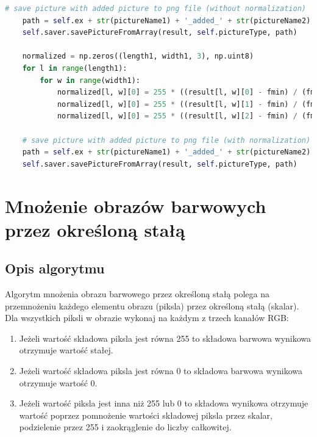 \documentclass[a4paper,12pt, titlepage]{report}
\begin{document}
\begin{lstlisting}[language=Python]
    # save picture with added picture to png file (without normalization)
    path = self.ex + str(pictureName1) + '_added_' + str(pictureName2) + '.png'
    self.saver.savePictureFromArray(result, self.pictureType, path)

    normalized = np.zeros((length1, width1, 3), np.uint8)
    for l in range(length1):
        for w in range(width1):
            normalized[l, w][0] = 255 * ((result[l, w][0] - fmin) / (fmax - fmin))
            normalized[l, w][0] = 255 * ((result[l, w][1] - fmin) / (fmax - fmin))
            normalized[l, w][0] = 255 * ((result[l, w][2] - fmin) / (fmax - fmin))

    # save picture with added picture to png file (with normalization)
    path = self.ex + str(pictureName1) + '_added_' + str(pictureName2) + '_normalized.png'
    self.saver.savePictureFromArray(result, self.pictureType, path)
\end{lstlisting}

\section{Mnożenie obrazów barwowych przez określoną stałą}
\subsection*{Opis algorytmu}
\par Algorytm mnożenia obrazu barwowego przez określoną stałą polega na przemnożeniu każdego elementu obrazu (piksla) przez określoną stałą (skalar). Dla wszystkich piksli w obrazie wykonaj na każdym z trzech kanałów RGB:
\begin{enumerate}
\item Jeżeli wartość składowa piksla jest równa 255 to składowa barwowa wynikowa otrzymuje wartość stałej.
\item Jeżeli wartość składowa piksla jest równa 0 to składowa barwowa wynikowa otrzymuje wartość 0.
\item Jeżeli wartość piksla jest inna niż 255 lub 0 to składowa wynikowa otrzymuje wartość poprzez pomnożenie wartości składowej piksla przez skalar, podzielenie przez 255 i zaokrąglenie do liczby całkowitej.
\end{enumerate}
\end{document}

